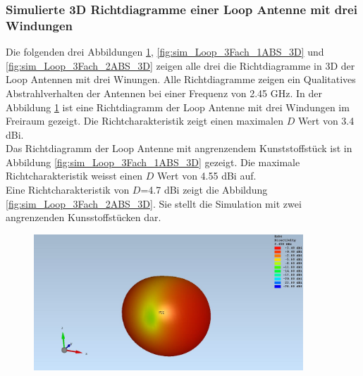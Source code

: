 \subsubsection{Simulierte 3D Richtdiagramme einer Loop Antenne mit drei Windungen}
Die folgenden drei Abbildungen \ref{fig:sim_Loop_3Fach_freiraum_3D}, \ref{fig:sim_Loop_3Fach_1ABS_3D} und \ref{fig:sim_Loop_3Fach_2ABS_3D} zeigen alle drei die Richtdiagramme in 3D der Loop Antennen mit drei Winungen. Alle Richtdiagramme zeigen ein Qualitatives Abstrahlverhalten der Antennen bei einer Frequenz von 2.45 GHz.
In der Abbildung \ref{fig:sim_Loop_3Fach_freiraum_3D} ist eine Richtdiagramm der Loop Antenne mit drei Windungen im Freiraum gezeigt. Die Richtcharakteristik zeigt einen maximalen $D$ Wert  von 3.4 dBi.\\
Das Richtdiagramm der Loop Antenne mit angrenzendem Kunststoffstück ist in Abbildung \ref{fig:sim_Loop_3Fach_1ABS_3D} gezeigt. Die maximale Richtcharakteristik weisst einen $D$ Wert von 4.55 dBi auf.\\
Eine Richtcharakteristik von $D$=4.7 dBi zeigt die Abbildung \ref{fig:sim_Loop_3Fach_2ABS_3D}. Sie stellt die Simulation mit zwei angrenzenden Kunsstoffstücken dar.
\begin{figure}[h]
	\begin{center}
		\includegraphics[width=0.9\textwidth]{content/bilder/Evaluation/Loop/ohneABS/EM_Far_Field_Loop_Coil_ohneABS.JPG}
		\label{fig:sim_Loop_3Fach_freiraum_3D}
	\end{center}
\end{figure}

